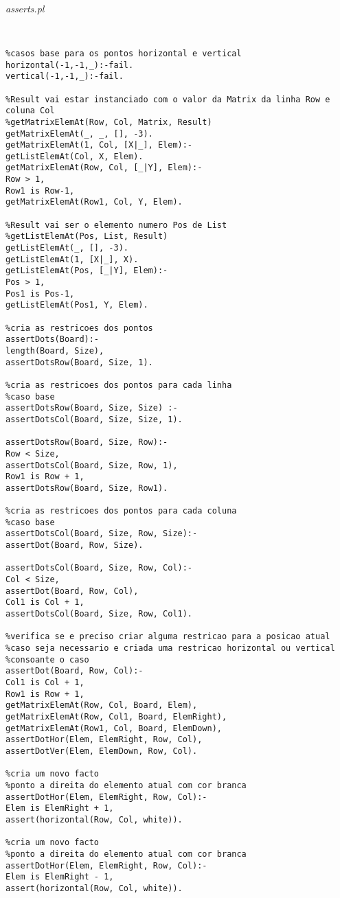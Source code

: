 \documentclass[runningheads,a4paper]{llncs}
\begin{document}
	\medskip
	
	\noindent
	{\it asserts.pl}
	\begin{changemargin}{-3cm}{-4cm}
		\begin{verbatim}
		

%casos base para os pontos horizontal e vertical
horizontal(-1,-1,_):-fail.
vertical(-1,-1,_):-fail.

%Result vai estar instanciado com o valor da Matrix da linha Row e coluna Col
%getMatrixElemAt(Row, Col, Matrix, Result)
getMatrixElemAt(_, _, [], -3).
getMatrixElemAt(1, Col, [X|_], Elem):-
getListElemAt(Col, X, Elem).
getMatrixElemAt(Row, Col, [_|Y], Elem):-
Row > 1,
Row1 is Row-1,
getMatrixElemAt(Row1, Col, Y, Elem).

%Result vai ser o elemento numero Pos de List
%getListElemAt(Pos, List, Result)
getListElemAt(_, [], -3).
getListElemAt(1, [X|_], X).
getListElemAt(Pos, [_|Y], Elem):-
Pos > 1,
Pos1 is Pos-1,
getListElemAt(Pos1, Y, Elem).

%cria as restricoes dos pontos
assertDots(Board):-
length(Board, Size),
assertDotsRow(Board, Size, 1).

%cria as restricoes dos pontos para cada linha
%caso base
assertDotsRow(Board, Size, Size) :-
assertDotsCol(Board, Size, Size, 1).

assertDotsRow(Board, Size, Row):-
Row < Size,
assertDotsCol(Board, Size, Row, 1),
Row1 is Row + 1,
assertDotsRow(Board, Size, Row1).

%cria as restricoes dos pontos para cada coluna
%caso base
assertDotsCol(Board, Size, Row, Size):-
assertDot(Board, Row, Size).

assertDotsCol(Board, Size, Row, Col):-
Col < Size,
assertDot(Board, Row, Col),
Col1 is Col + 1,
assertDotsCol(Board, Size, Row, Col1).

%verifica se e preciso criar alguma restricao para a posicao atual
%caso seja necessario e criada uma restricao horizontal ou vertical
%consoante o caso
assertDot(Board, Row, Col):-
Col1 is Col + 1,
Row1 is Row + 1,
getMatrixElemAt(Row, Col, Board, Elem),
getMatrixElemAt(Row, Col1, Board, ElemRight),
getMatrixElemAt(Row1, Col, Board, ElemDown),
assertDotHor(Elem, ElemRight, Row, Col),
assertDotVer(Elem, ElemDown, Row, Col).

%cria um novo facto
%ponto a direita do elemento atual com cor branca
assertDotHor(Elem, ElemRight, Row, Col):-
Elem is ElemRight + 1,
assert(horizontal(Row, Col, white)).

%cria um novo facto
%ponto a direita do elemento atual com cor branca
assertDotHor(Elem, ElemRight, Row, Col):-
Elem is ElemRight - 1,
assert(horizontal(Row, Col, white)).


\end{verbatim}
\end{changemargin}
\end{document}
